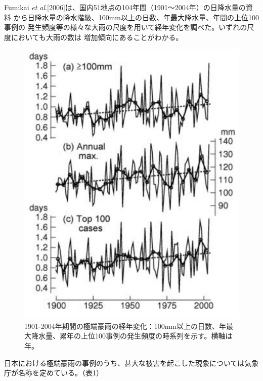 Fumikai \textit{et al}.[2006]は、国内51地点の104年間（1901～2004年）の日降水量の資料
から日降水量の降水階級、100mm以上の日数、年最大降水量、年間の上位100事例の
発生頻度等の様々な大雨の尺度を用いて経年変化を調べた。いずれの尺度においても大雨の数は
増加傾向にあることがわかる。

\begin{figure}[H]
\begin{center}
\includegraphics[width=0.8\linewidth]{fig/intro/fumikai-et-al-chart1.png}
\caption{1901-2004年期間の極端豪雨の経年変化：100mm以上の日数、年最大降水量、累年の上位100事例の発生頻度の時系列を示す。横軸は年。}
\end{center}
\end{figure}

日本における極端豪雨の事例のうち、甚大な被害を起こした現象については気象庁が名称を定めている。（表1）

